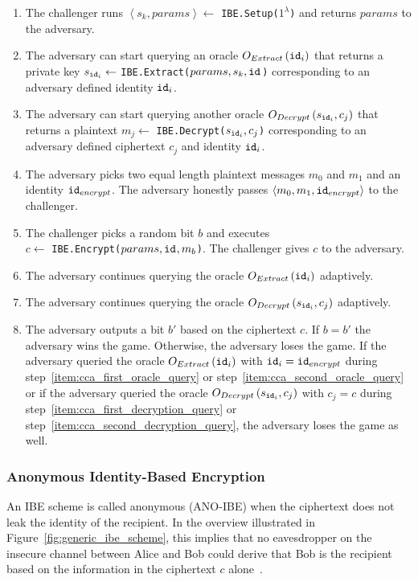 \begin{game}
 \begin{enumerate}
  \item The challenger runs $\left< s_k, params\right> \leftarrow$ \texttt{IBE.Setup($1^{\lambda}$)} and returns $params$ to the adversary.
  \item \label{item:cca_first_oracle_query} The adversary can start querying an oracle $O_{Extract} \left( \mathtt{id}_{i} \right)$ that returns a private key $s_{\mathtt{id}_{i}} \leftarrow$ \texttt{IBE.Extract($params, s_k, \mathtt{id}_{}$)} corresponding to an adversary defined identity $\mathtt{id}_{i}$.
  \item \label{item:cca_first_decryption_query} The adversary can start querying another oracle $O_{Decrypt} \left( s_{\mathtt{id}_{i}}, c_j \right)$ that returns a plaintext $m_j \leftarrow$ \texttt{IBE.Decrypt($s_{\mathtt{id}_{i}}, c_j$)} corresponding to an adversary defined ciphertext $c_j$ and identity $\mathtt{id}_{i}$.
  \item The adversary picks two equal length plaintext messages $m_0$ and $m_1$ and an identity $\mathtt{id}_{encrypt}$. The adversary honestly passes $\left< m_0, m_1, \mathtt{id}_{encrypt} \right>$ to the challenger.
  \item The challenger picks a random bit $b$ and executes \\ $c \leftarrow$ \texttt{IBE.Encrypt($params, \mathtt{id}_{}, m_b$)}. The challenger gives $c$ to the adversary.
  \item \label{item:cca_second_oracle_query} The adversary continues querying the oracle $O_{Extract} \left( \mathtt{id}_{i} \right)$ adaptively.
  \item \label{item:cca_second_decryption_query} The adversary continues querying the oracle $O_{Decrypt} \left( s_{\mathtt{id}_{i}}, c_j \right)$ adaptively.
  \item The adversary outputs a bit $b'$ based on the ciphertext $c$. If $b = b'$ the adversary wins the game. Otherwise, the adversary loses the game. If the adversary queried the oracle $O_{Extract} \left( \mathtt{id}_{i} \right)$ with $\mathtt{id}_{i} = \mathtt{id}_{encrypt}$ during step~\ref{item:cca_first_oracle_query} or step~\ref{item:cca_second_oracle_query} or if the adversary queried the oracle $O_{Decrypt} \left( s_{\mathtt{id}_{i}}, c_j \right)$ with $c_j = c$ during step~\ref{item:cca_first_decryption_query} or step~\ref{item:cca_second_decryption_query}, the adversary loses the game as well.
 \end{enumerate}
\end{game}

\subsubsection{Anonymous Identity-Based Encryption}
An IBE scheme is called anonymous (ANO-IBE) when the ciphertext does not leak the identity of the recipient. In the overview illustrated in Figure~\ref{fig:generic_ibe_scheme}, this implies that no eavesdropper on the insecure channel between Alice and Bob could derive that Bob is the recipient based on the information in the ciphertext $c$ alone~\cite{art:BoyenW06}.

